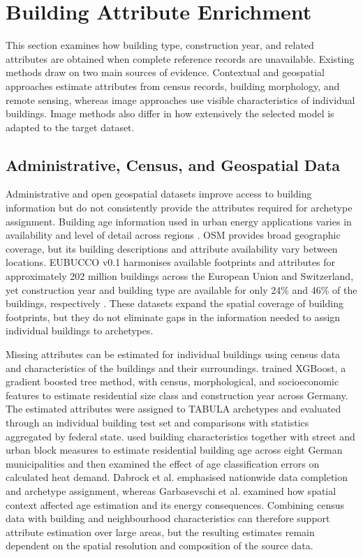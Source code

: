 \section{Building Attribute Enrichment}
\label{sec:building_attribute_enrichment}

This section examines how building type, construction year, and related attributes are obtained when complete reference records are unavailable. Existing methods draw on two main sources of evidence. Contextual and geospatial approaches estimate attributes from census records, building morphology, and remote sensing, whereas image approaches use visible characteristics of individual buildings. Image methods also differ in how extensively the selected model is adapted to the target dataset.

\subsection{Administrative, Census, and Geospatial Data}
\label{sec:administrative_geospatial_data}

Administrative and open geospatial datasets improve access to building information but do not consistently provide the attributes required for archetype assignment. Building age information used in urban energy applications varies in availability and level of detail across regions \parencite{garbasevschi2021}. \Ac{OSM} provides broad geographic coverage, but its building descriptions and attribute availability vary between locations. EUBUCCO v0.1 harmonises available footprints and attributes for approximately 202 million buildings across the European Union and Switzerland, yet construction year and building type are available for only 24\% and 46\% of the buildings, respectively \parencite{milojevicdupont2023}. These datasets expand the spatial coverage of building footprints, but they do not eliminate gaps in the information needed to assign individual buildings to archetypes.

Missing attributes can be estimated for individual buildings using census data and characteristics of the buildings and their surroundings. \textcite{dabrock2025} trained XGBoost, a gradient boosted tree method, with census, morphological, and socioeconomic features to estimate residential size class and construction year across Germany. The estimated attributes were assigned to \ac{TABULA} archetypes and evaluated through an individual building test set and comparisons with statistics aggregated by federal state. \textcite{garbasevschi2021} used building characteristics together with street and urban block measures to estimate residential building age across eight German municipalities and then examined the effect of age classification errors on calculated heat demand. Dabrock et al. emphasised nationwide data completion and archetype assignment, whereas Garbasevschi et al. examined how spatial context affected age estimation and its energy consequences. Combining census data with building and neighbourhood characteristics can therefore support attribute estimation over large areas, but the resulting estimates remain dependent on the spatial resolution and composition of the source data.

